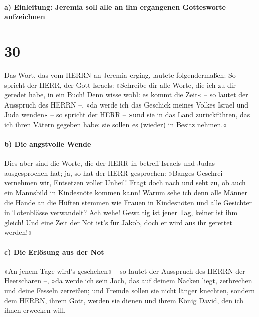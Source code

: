 \hypertarget{a-einleitung-jeremia-soll-alle-an-ihn-ergangenen-gottesworte-aufzeichnen}{%
\paragraph{a) Einleitung: Jeremia soll alle an ihn ergangenen
Gottesworte
aufzeichnen}\label{a-einleitung-jeremia-soll-alle-an-ihn-ergangenen-gottesworte-aufzeichnen}}

\hypertarget{section-29}{%
\section{30}\label{section-29}}

Das Wort, das vom HERRN an Jeremia erging, lautete
folgendermaßen: So spricht der HERR, der Gott Israels:
»Schreibe dir alle Worte, die ich zu dir geredet habe, in ein Buch!
Denn wisse wohl: es kommt die Zeit« -- so lautet der
Ausspruch des HERRN --, »da werde ich das Geschick meines Volkes Israel
und Juda wenden« -- so spricht der HERR -- »und sie in das Land
zurückführen, das ich ihren Vätern gegeben habe: sie sollen es (wieder)
in Besitz nehmen.«

\hypertarget{b-die-angstvolle-wende}{%
\paragraph{b) Die angstvolle Wende}\label{b-die-angstvolle-wende}}

Dies aber sind die Worte, die der HERR in betreff Israels
und Judas ausgesprochen hat; ja, so hat der HERR
gesprochen: »Banges Geschrei vernehmen wir, Entsetzen voller Unheil!
Fragt doch nach und seht zu, ob auch ein Mannsbild in
Kindesnöte kommen kann! Warum sehe ich denn alle Männer die Hände an die
Hüften stemmen wie Frauen in Kindesnöten und alle Gesichter in
Totenblässe verwandelt? Ach wehe! Gewaltig ist jener Tag,
keiner ist ihm gleich! Und eine Zeit der Not ist's für Jakob, doch er
wird aus ihr gerettet werden!«

\hypertarget{c-die-erluxf6sung-aus-der-not}{%
\paragraph{c) Die Erlösung aus der
Not}\label{c-die-erluxf6sung-aus-der-not}}

»An jenem Tage wird's geschehen« -- so lautet der
Ausspruch des HERRN der Heerscharen --, »da werde ich sein Joch, das auf
deinem Nacken liegt, zerbrechen und deine Fesseln zerreißen; und Fremde
sollen sie nicht länger knechten, sondern dem HERRN, ihrem
Gott, werden sie dienen und ihrem König David, den ich ihnen erwecken
will.

